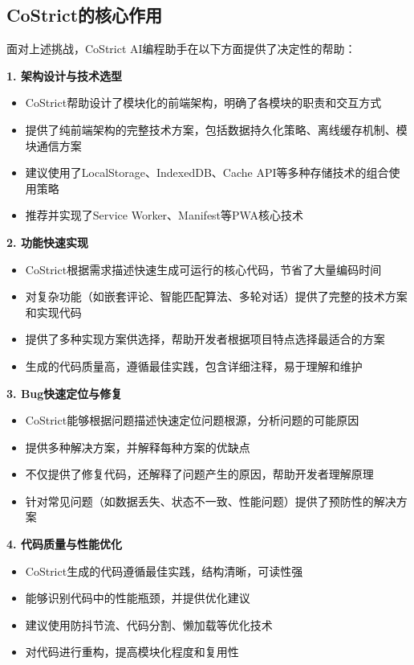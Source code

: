 \documentclass[12pt,a4paper]{article}
\begin{document}
\subsection{CoStrict的核心作用}

面对上述挑战，CoStrict AI编程助手在以下方面提供了决定性的帮助：

\textbf{1. 架构设计与技术选型}
\begin{itemize}
    \item CoStrict帮助设计了模块化的前端架构，明确了各模块的职责和交互方式
    \item 提供了纯前端架构的完整技术方案，包括数据持久化策略、离线缓存机制、模块通信方案
    \item 建议使用了LocalStorage、IndexedDB、Cache API等多种存储技术的组合使用策略
    \item 推荐并实现了Service Worker、Manifest等PWA核心技术
\end{itemize}

\textbf{2. 功能快速实现}
\begin{itemize}
    \item CoStrict根据需求描述快速生成可运行的核心代码，节省了大量编码时间
    \item 对复杂功能（如嵌套评论、智能匹配算法、多轮对话）提供了完整的技术方案和实现代码
    \item 提供了多种实现方案供选择，帮助开发者根据项目特点选择最适合的方案
    \item 生成的代码质量高，遵循最佳实践，包含详细注释，易于理解和维护
\end{itemize}

\textbf{3. Bug快速定位与修复}
\begin{itemize}
    \item CoStrict能够根据问题描述快速定位问题根源，分析问题的可能原因
    \item 提供多种解决方案，并解释每种方案的优缺点
    \item 不仅提供了修复代码，还解释了问题产生的原因，帮助开发者理解原理
    \item 针对常见问题（如数据丢失、状态不一致、性能问题）提供了预防性的解决方案
\end{itemize}

\textbf{4. 代码质量与性能优化}
\begin{itemize}
    \item CoStrict生成的代码遵循最佳实践，结构清晰，可读性强
    \item 能够识别代码中的性能瓶颈，并提供优化建议
    \item 建议使用防抖节流、代码分割、懒加载等优化技术
    \item 对代码进行重构，提高模块化程度和复用性
\end{itemize}
\end{document}
